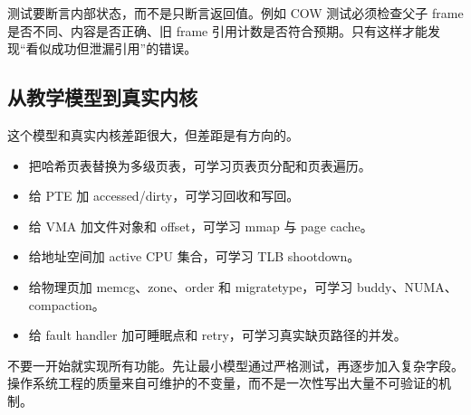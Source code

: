 测试要断言内部状态，而不是只断言返回值。例如 COW 测试必须检查父子 frame 是否不同、内容是否正确、旧 frame 引用计数是否符合预期。只有这样才能发现“看似成功但泄漏引用”的错误。

\subsection{从教学模型到真实内核}

这个模型和真实内核差距很大，但差距是有方向的。

\begin{itemize}
\tightlist
\item 把哈希页表替换为多级页表，可学习页表页分配和页表遍历。
\item 给 PTE 加 accessed/dirty，可学习回收和写回。
\item 给 VMA 加文件对象和 offset，可学习 mmap 与 page cache。
\item 给地址空间加 active CPU 集合，可学习 TLB shootdown。
\item 给物理页加 memcg、zone、order 和 migratetype，可学习 buddy、NUMA、compaction。
\item 给 fault handler 加可睡眠点和 retry，可学习真实缺页路径的并发。
\end{itemize}

不要一开始就实现所有功能。先让最小模型通过严格测试，再逐步加入复杂字段。操作系统工程的质量来自可维护的不变量，而不是一次性写出大量不可验证的机制。
